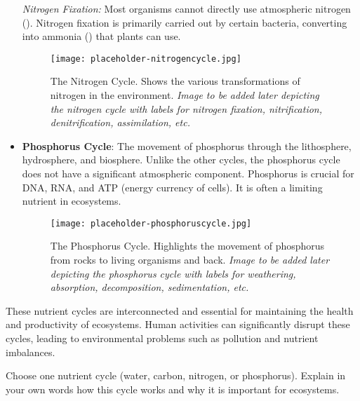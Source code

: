 \begin{itemize}
    \begin{marginnote}
    \textit{Nitrogen Fixation:}  Most organisms cannot directly use atmospheric nitrogen ().  Nitrogen fixation is primarily carried out by certain bacteria, converting  into ammonia () that plants can use. 
    \end{marginnote}

    \begin{figure}[h]
        \texttt{[image: placeholder-nitrogencycle.jpg]}
        \caption{The Nitrogen Cycle. Shows the various transformations of nitrogen in the environment. \textit{Image to be added later depicting the nitrogen cycle with labels for nitrogen fixation, nitrification, denitrification, assimilation, etc.}}
    \end{figure}

    \item \textbf{Phosphorus Cycle}:  The movement of phosphorus through the lithosphere, hydrosphere, and biosphere. Unlike the other cycles, the phosphorus cycle does not have a significant atmospheric component. Phosphorus is crucial for DNA, RNA, and ATP (energy currency of cells).  It is often a limiting nutrient in ecosystems.

    \begin{figure}[h]
        \texttt{[image: placeholder-phosphoruscycle.jpg]}
        \caption{The Phosphorus Cycle.  Highlights the movement of phosphorus from rocks to living organisms and back. \textit{Image to be added later depicting the phosphorus cycle with labels for weathering, absorption, decomposition, sedimentation, etc.}}
    \end{figure}
\end{itemize}

These nutrient cycles are interconnected and essential for maintaining the health and productivity of ecosystems. Human activities can significantly disrupt these cycles, leading to environmental problems such as pollution and nutrient imbalances.

\begin{stopandthink}
Choose one nutrient cycle (water, carbon, nitrogen, or phosphorus). Explain in your own words how this cycle works and why it is important for ecosystems.
\end{stopandthink}


